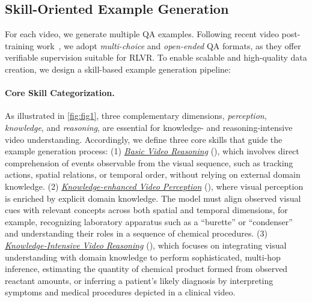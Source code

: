 \subsection{Skill-Oriented Example Generation}\label{sec:3.3}
For each video,
we generate multiple QA examples.
Following recent video post-training work~\cite{videor1, Open-o3}, we adopt \emph{multi-choice} and \emph{open-ended} QA formats, as they offer verifiable supervision suitable for RLVR. To enable scalable and high-quality data creation, we design a skill-based example generation pipeline:

\vspace{-8pt}
\paragraph{Core Skill Categorization.}
As illustrated in \autoref{fig:fig1}, three complementary dimensions, \ie \emph{perception}, \emph{knowledge}, and \emph{reasoning}, are essential for knowledge- and reasoning-intensive video understanding. Accordingly, we define three core skills that guide the example generation process:
(1) \underline{\emph{Basic Video Reasoning}} (\vr), which involves direct comprehension of events observable from the visual sequence, such as tracking actions, spatial relations, or temporal order, without relying on external domain knowledge.
(2) \underline{\emph{Knowledge-enhanced Video Perception}} (\kv), where visual perception is enriched by explicit domain knowledge. The model must align observed visual cues with relevant concepts across both spatial and temporal dimensions, for example, recognizing laboratory apparatus such as a ``burette'' or ``condenser'' and understanding their roles in a sequence of chemical procedures.
(3) \underline{\emph{Knowledge-Intensive Video Reasoning}} (\kvr), which focuses on integrating visual understanding with domain knowledge to perform sophisticated, multi-hop inference, \eg estimating the quantity of chemical product formed from observed reactant amounts, or inferring a patient’s likely diagnosis by interpreting symptoms and medical procedures depicted in a clinical video.

\vspace{-8pt}
